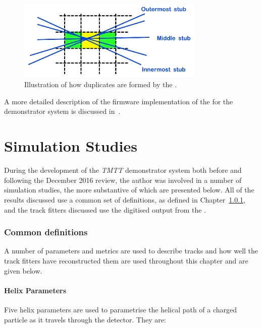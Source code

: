 \begin{figure}[!h]
\centering
\includegraphics[width=0.80\textwidth]{figs/tk-upgrade/A50_algo.pdf}
\caption{Illustration of how duplicates are formed by the \rphi \HT.}
\label{fig:DR}
\end{figure}

A more detailed description of the firmware implementation of the \DR for the demonstrator system is discussed in~\cite{TMTT_JINST}.

\section{Simulation Studies}\label{sec:TmttSimStudies}

During the development of the \emph{TMTT} demonstrator system both before and following the December 2016 review, the author was involved in a number of simulation studies, the more substantive of which are presented below.
All of the results discussed use a common set of definitions, as defined in Chapter~\ref{subsubsec:helixParameter}, and the track fitters discussed use the digitised output from the \HT.

\subsubsection{Common definitions}\label{subsubsec:helixParameter}
A number of parameters and metrics are used to describe tracks and how well the track fitters have reconstructed them are used throughout this chapter and are given below.

\paragraph{Helix Parameters}
Five helix parameters are used to parametrise the helical path of a charged particle as it travels through the detector.
They are:

